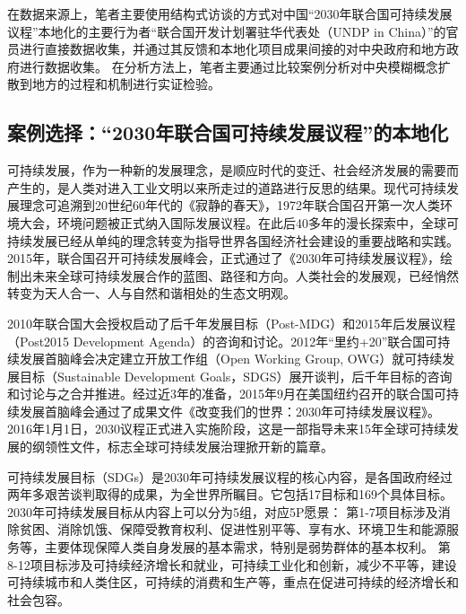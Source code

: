 \documentclass[
  12pt,
]{ctexart}
\begin{document}
在数据来源上，笔者主要使用结构式访谈的方式对中国``2030年联合国可持续发展议程''本地化的主要行为者``联合国开发计划署驻华代表处（UNDP in China）''的官员进行直接数据收集，并通过其反馈和本地化项目成果间接的对中央政府和地方政府进行数据收集。
在分析方法上，笔者主要通过比较案例分析对中央模糊概念扩散到地方的过程和机制进行实证检验。

\hypertarget{ux6848ux4f8bux9009ux62e92030ux5e74ux8054ux5408ux56fdux53efux6301ux7eedux53d1ux5c55ux8baeux7a0bux7684ux672cux5730ux5316}{%
\subsection{案例选择：``2030年联合国可持续发展议程''的本地化}\label{ux6848ux4f8bux9009ux62e92030ux5e74ux8054ux5408ux56fdux53efux6301ux7eedux53d1ux5c55ux8baeux7a0bux7684ux672cux5730ux5316}}

可持续发展，作为一种新的发展理念，是顺应时代的变迁、社会经济发展的需要而产生的，是人类对进入工业文明以来所走过的道路进行反思的结果。现代可持续发展理念可追溯到20世纪60年代的《寂静的春天》，1972年联合国召开第一次人类环境大会，环境问题被正式纳入国际发展议程。在此后40多年的漫长探索中，全球可持续发展已经从单纯的理念转变为指导世界各国经济社会建设的重要战略和实践。2015年，联合国召开可持续发展峰会，正式通过了《2030年可持续发展议程》，绘制出未来全球可持续发展合作的蓝图、路径和方向。人类社会的发展观，已经悄然转变为天人合一、人与自然和谐相处的生态文明观。

2010年联合国大会授权启动了后千年发展目标（Post-MDG）和2015年后发展议程（Post2015 Development Agenda）的咨询和讨论。2012年``里约+20''联合国可持续发展首脑峰会决定建立开放工作组（Open Working Group, OWG）就可持续发展目标（Sustainable Development Goals，SDGS）展开谈判，后千年目标的咨询和讨论与之合并推进。经过近3年的准备，2015年9月在美国纽约召开的联合国可持续发展首脑峰会通过了成果文件《改变我们的世界：2030年可持续发展议程》。2016年1月1日，2030议程正式进入实施阶段，这是一部指导未来15年全球可持续发展的纲领性文件，标志全球可持续发展治理掀开新的篇章。

可持续发展目标（SDGs）是2030年可持续发展议程的核心内容，是各国政府经过两年多艰苦谈判取得的成果，为全世界所瞩目。它包括17目标和169个具体目标。2030年可持续发展目标从内容上可以分为5组，对应5P愿景：
第1-7项目标涉及消除贫困、消除饥饿、保障受教育权利、促进性别平等、享有水、环境卫生和能源服务等，主要体现保障人类自身发展的基本需求，特别是弱势群体的基本权利。
第8-12项目标涉及可持续经济增长和就业，可持续工业化和创新，减少不平等，建设可持续城市和人类住区，可持续的消费和生产等，重点在促进可持续的经济增长和社会包容。
\end{document}
